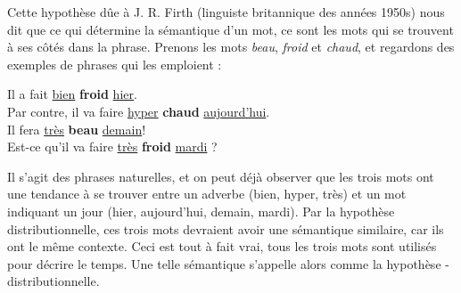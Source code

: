 \documentclass[11pt, a4paper]{report}
\begin{document}
Cette hypothèse dûe à J. R. Firth (linguiste britannique des années 1950s) nous dit que ce qui détermine la 
sémantique d'un mot, ce sont les mots qui se trouvent à ses côtés dans la phrase. Prenons les mots 
\textit{beau}, \textit{froid} et \textit{chaud}, et regardons des exemples de 
phrases qui les emploient : 

\begin{center}
  Il a fait \underline{bien} \textbf{froid} \underline{hier}. \\
  Par contre, il va faire \underline{hyper} \textbf{chaud} \underline{aujourd'hui}. \\
  Il fera \underline{très} \textbf{beau} \underline{demain}! \\
  Est-ce qu'il va faire \underline{très} \textbf{froid} \underline{mardi} ?
\end{center}

Il s'agit des phrases naturelles, et on peut déjà observer que les trois mots 
ont une tendance à se trouver entre un adverbe (bien, hyper, très) et un mot indiquant 
un jour (hier, aujourd'hui, demain, mardi). Par la hypothèse distributionnelle, ces trois mots 
devraient avoir une sémantique similaire, car ils ont le même 
contexte. Ceci est tout à fait vrai, tous les trois mots sont utilisés pour décrire le temps. 
Une telle sémantique s'appelle alors comme la hypothèse - distributionnelle. 
\end{document}
